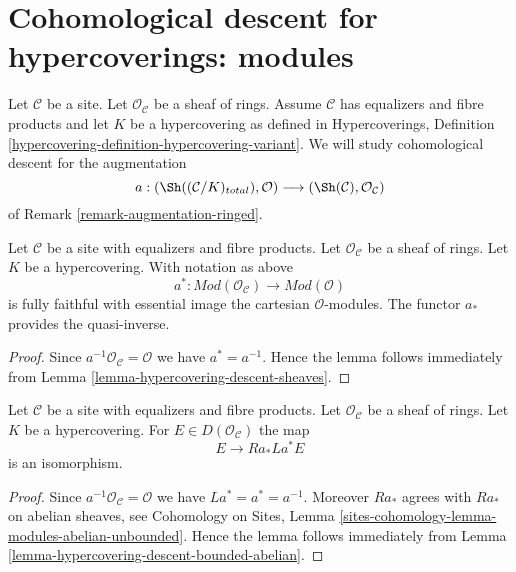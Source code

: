 \section{Cohomological descent for hypercoverings: modules}
\label{section-cohomological-descent-hypercoverings-modules}

\noindent
Let $\mathcal{C}$ be a site. Let $\mathcal{O}_\mathcal{C}$
be a sheaf of rings. Assume $\mathcal{C}$
has equalizers and fibre products and let $K$ be a hypercovering
as defined in Hypercoverings, Definition
\ref{hypercovering-definition-hypercovering-variant}. We will study
cohomological descent for the augmentation
$$
a :
(\Sh((\mathcal{C}/K)_{total}), \mathcal{O})
\longrightarrow
(\Sh(\mathcal{C}), \mathcal{O}_\mathcal{C})
$$
of Remark \ref{remark-augmentation-ringed}.

\begin{lemma}
\label{lemma-hypercovering-descent-modules}
Let $\mathcal{C}$ be a site with equalizers and fibre products.
Let $\mathcal{O}_\mathcal{C}$ be a sheaf of rings.
Let $K$ be a hypercovering. With notation as above
$$
a^* : \textit{Mod}(\mathcal{O}_\mathcal{C}) \to \textit{Mod}(\mathcal{O})
$$
is fully faithful with essential image the cartesian $\mathcal{O}$-modules.
The functor $a_*$ provides the quasi-inverse.
\end{lemma}

\begin{proof}
Since $a^{-1}\mathcal{O}_\mathcal{C} = \mathcal{O}$ we have
$a^* = a^{-1}$. Hence the lemma follows
immediately from Lemma \ref{lemma-hypercovering-descent-sheaves}.
\end{proof}

\begin{lemma}
\label{lemma-hypercovering-descent-bounded-modules}
Let $\mathcal{C}$ be a site with equalizers and fibre products.
Let $\mathcal{O}_\mathcal{C}$ be a sheaf of rings.
Let $K$ be a hypercovering. For
$E \in D(\mathcal{O}_\mathcal{C})$ the map
$$
E \longrightarrow Ra_*La^*E
$$
is an isomorphism.
\end{lemma}

\begin{proof}
Since $a^{-1}\mathcal{O}_\mathcal{C} = \mathcal{O}$ we have
$La^* = a^* = a^{-1}$. Moreover $Ra_*$ agrees with
$Ra_*$ on abelian sheaves, see
Cohomology on Sites, Lemma
\ref{sites-cohomology-lemma-modules-abelian-unbounded}.
Hence the lemma follows
immediately from Lemma \ref{lemma-hypercovering-descent-bounded-abelian}.
\end{proof}

